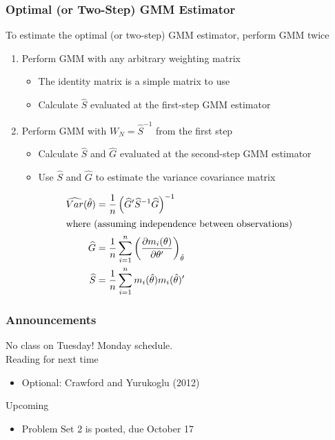 \documentclass{beamer}
\begin{document}
\begin{frame}\frametitle{Optimal (or Two-Step) GMM Estimator}
    To estimate the optimal (or two-step) GMM estimator, perform GMM twice
    \begin{enumerate}
    	\item Perform GMM with any arbitrary weighting matrix
    	\begin{itemize}
    		\item The identity matrix is a simple matrix to use
    		\item Calculate $\widehat{S}$ evaluated at the first-step GMM estimator
    	\end{itemize}
    	\item Perform GMM with $W_N = \widehat{S}^{-1}$ from the first step
    	\begin{itemize}
    		\item Calculate $\widehat{S}$ and $\widehat{G}$ evaluated at the second-step GMM estimator
    		\item Use $\widehat{S}$ and $\widehat{G}$ to estimate the variance covariance matrix
    	\end{itemize}
    \end{enumerate}
    \vspace{2ex}
    \begin{align*}
    	\widehat{Var}(\hat{\theta}) &= \frac{1}{n} \left( \widehat{G}' \widehat{S}^{-1} \widehat{G} \right)^{-1} \\
    	\intertext{where (assuming independence between observations)}
    	\widehat{G} &= \frac{1}{n} \sum_{i =1 }^n \left( \frac{\partial m_i(\theta)}{\partial \theta'} \right)_{\hat{\theta}} \\
    	\widehat{S} &= \frac{1}{n} \sum_{i = 1}^n m_i(\hat{\theta}) m_i(\hat{\theta})'
    \end{align*}
\end{frame}

\begin{frame}\frametitle{Announcements}
	No class on Tuesday! Monday schedule. \\
	\vspace{3ex}
    Reading for next time
    \begin{itemize}
        \item Optional: Crawford and Yurukoglu (2012)
    \end{itemize}
    \vspace{3ex}
    Upcoming
    \begin{itemize}
        \item Problem Set 2 is posted, due October 17
    \end{itemize}
\end{frame}
\end{document}
